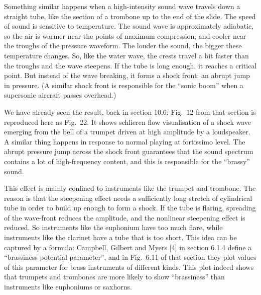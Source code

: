   Something similar happens when a high-intensity sound wave travels down a 
  straight tube, like the section of a trombone up to the end of the slide. The 
  speed of sound is sensitive to temperature. The sound wave is approximately 
  adiabatic, so the air is warmer near the points of maximum compression, and 
  cooler near the troughs of the pressure waveform. The louder the sound, the 
  bigger these temperature changes. So, like the water wave, the crests travel 
  a bit faster than the troughs and the wave steepens. If the tube is long 
  enough, it reaches a critical point. But instead of the wave breaking, it 
  forms a shock front: an abrupt jump in pressure. (A similar shock front is 
  responsible for the “sonic boom” when a supersonic aircraft passes overhead.) 

  We have already seen the result, back in section 10.6: Fig.\ 12 from that 
  section is reproduced here as Fig.\ 22. It shows schlieren flow visualisation 
  of a shock wave emerging from the bell of a trumpet driven at high amplitude 
  by a loudspeaker. A similar thing happens in response to normal playing at 
  fortissimo level. The abrupt pressure jump across the shock front guarantees 
  that the sound spectrum contains a lot of high-frequency content, and this is 
  responsible for the “brassy” sound. 


  This effect is mainly confined to instruments like the trumpet and trombone. 
  The reason is that the steepening effect needs a sufficiently long stretch of 
  cylindrical tube in order to build up enough to form a shock. If the tube is 
  flaring, spreading of the wave-front reduces the amplitude, and the nonlinear 
  steepening effect is reduced. So instruments like the euphonium have too much 
  flare, while instruments like the clarinet have a tube that is too short. 
  This idea can be captured by a formula: Campbell, Gilbert and Myers [4] in 
  section 6.1.4 define a “brassiness potential parameter”, and in Fig.\ 6.11 of 
  that section they plot values of this parameter for brass instruments of 
  different kinds. This plot indeed shows that trumpets and trombones are more 
  likely to show “brassiness” than instruments like euphoniums or saxhorns. 

